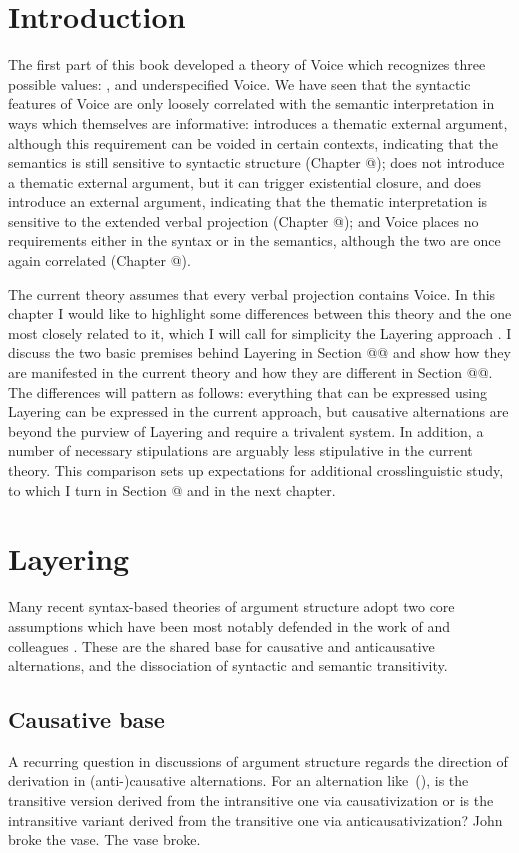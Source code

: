 \section{Introduction} \label{sec:intro}
The first part of this book developed a theory of Voice which recognizes three possible values: {\vd}, {\vz} and underspecified Voice. We have seen that the syntactic features of Voice are only loosely correlated with the semantic interpretation in ways which themselves are informative: {\vd} introduces a thematic external argument, although this requirement can be voided in certain contexts, indicating that the semantics is still sensitive to syntactic structure (Chapter @); {\vz} does not introduce a thematic external argument, but it can trigger existential closure, and {\pz} does introduce an external argument, indicating that the thematic interpretation is sensitive to the extended verbal projection (Chapter @); and Voice places no requirements either in the syntax or in the semantics, although the two are once again correlated (Chapter @).

The current theory assumes that every verbal projection contains Voice. In this chapter I would like to highlight some differences between this theory and the one most closely related to it, which I will call for simplicity the Layering approach \citep{schaefer08,layering15}. I discuss the two basic premises behind Layering in Section @@ and show how they are manifested in the current theory and how they are different in Section @@. The differences will pattern as follows: everything that can be expressed using Layering can be expressed in the current approach, but causative alternations are beyond the purview of Layering and require a trivalent system. In addition, a number of necessary stipulations are arguably less stipulative in the current theory. This comparison sets up expectations for additional crosslinguistic study, to which I turn in Section @ and in the next chapter.


\section{Layering}
Many recent syntax-based theories of argument structure adopt two core assumptions which have been most notably defended in the work of \cite{schaefer08} and colleagues \citep{alexiadouetal06,layering15}. These are the shared base for causative and anticausative alternations, and the dissociation of syntactic and semantic transitivity.

	\subsection{Causative base}
A recurring question in discussions of argument structure regards the direction of derivation in (anti-)causative alternations. For an alternation like~(\nextx), is the transitive version derived from the intransitive one via causativization or is the intransitive variant derived from the transitive one via anticausativization?
\pex
	\a John broke the vase.
	\a The vase broke.
\xe

